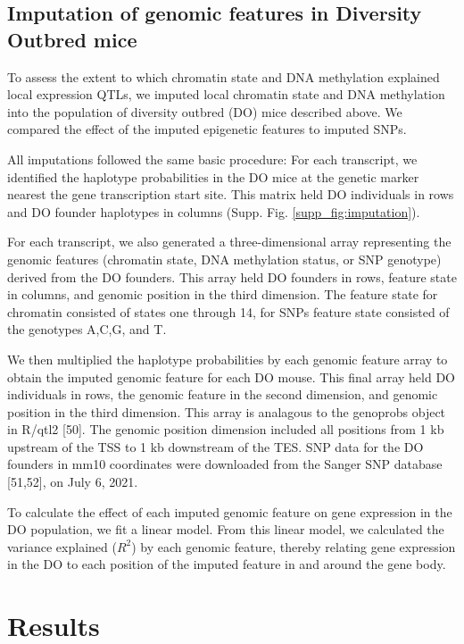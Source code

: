 \documentclass[10pt,letterpaper]{article}
\begin{document}
\hypertarget{imputation-of-genomic-features-in-diversity-outbred-mice}{%
\subsection{Imputation of genomic features in Diversity Outbred
mice}\label{imputation-of-genomic-features-in-diversity-outbred-mice}}

To assess the extent to which chromatin state and DNA methylation
explained local expression QTLs, we imputed local chromatin state and
DNA methylation into the population of diversity outbred (DO) mice
described above. We compared the effect of the imputed epigenetic
features to imputed SNPs.

All imputations followed the same basic procedure: For each transcript,
we identified the haplotype probabilities in the DO mice at the genetic
marker nearest the gene transcription start site. This matrix held DO
individuals in rows and DO founder haplotypes in columns (Supp. Fig.
\ref{supp_fig:imputation}).

For each transcript, we also generated a three-dimensional array
representing the genomic features (chromatin state, DNA methylation
status, or SNP genotype) derived from the DO founders. This array held
DO founders in rows, feature state in columns, and genomic position in
the third dimension. The feature state for chromatin consisted of states
one through 14, for SNPs feature state consisted of the genotypes A,C,G,
and T.

We then multiplied the haplotype probabilities by each genomic feature
array to obtain the imputed genomic feature for each DO mouse. This
final array held DO individuals in rows, the genomic feature in the
second dimension, and genomic position in the third dimension. This
array is analagous to the genoprobs object in R/qtl2 {[}50{]}. The
genomic position dimension included all positions from 1 kb upstream of
the TSS to 1 kb downstream of the TES. SNP data for the DO founders in
mm10 coordinates were downloaded from the Sanger SNP database
{[}51,52{]}, on July 6, 2021.

To calculate the effect of each imputed genomic feature on gene
expression in the DO population, we fit a linear model. From this linear
model, we calculated the variance explained (\(R^2\)) by each genomic
feature, thereby relating gene expression in the DO to each position of
the imputed feature in and around the gene body.

\hypertarget{results}{%
\section{Results}\label{results}}
\end{document}
